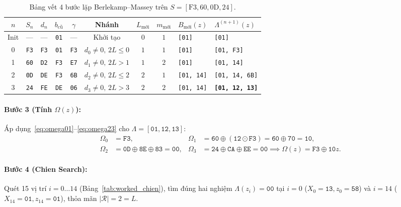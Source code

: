 \begin{table}[!htb]
\centering
\caption{Bảng vết 4 bước lặp Berlekamp--Massey trên $S = [\text{F3}, \text{60}, \text{0D}, \text{24}]$.}
\label{tab:worked_bm}
\scriptsize
\setlength{\tabcolsep}{4pt}
\begin{tabular}{@{} c c c c c c c c l l @{}}
\toprule
$n$ & $S_n$ & $d_n$ & $b_{\text{cũ}}$ & $\gamma$ & Nhánh & $L_{\text{mới}}$ & $m_{\text{mới}}$ & $B_{\text{mới}}(z)$ & $\Lambda^{(n+1)}(z)$ \\
\midrule
Init & --- & --- & \texttt{01} & --- & Khởi tạo & $0$ & $1$ & \texttt{[01]} & \texttt{[01]} \\
0 & \texttt{F3} & \texttt{F3} & \texttt{01} & \texttt{F3} & $d_0\neq 0,\, 2L\le 0$ & $1$ & $1$ & \texttt{[01]} & \texttt{[01, F3]} \\
1 & \texttt{60} & \texttt{D2} & \texttt{F3} & \texttt{E7} & $d_1\neq 0,\, 2L>1$ & $1$ & $2$ & \texttt{[01]} & \texttt{[01, 14]} \\
2 & \texttt{0D} & \texttt{DE} & \texttt{F3} & \texttt{6B} & $d_2\neq 0,\, 2L\le 2$ & $2$ & $1$ & \texttt{[01, 14]} & \texttt{[01, 14, 6B]} \\
3 & \texttt{24} & \texttt{FE} & \texttt{DE} & \texttt{06} & $d_3\neq 0,\, 2L>3$ & $2$ & $2$ & \texttt{[01, 14]} & \textbf{\texttt{[01, 12, 13]}} \\
\bottomrule
\end{tabular}
\end{table}

\paragraph{Bước 3 (Tính $\Omega(z)$):} Áp dụng~\eqref{eq:omega01}--\eqref{eq:omega23} cho $\Lambda = [\texttt{01}, \texttt{12}, \texttt{13}]$:
\begin{align*}
\Omega_0 &= \texttt{F3}, &
\Omega_1 &= \texttt{60} \oplus (\texttt{12} \odot \texttt{F3}) = \texttt{60} \oplus \texttt{70} = \texttt{10}, \\
\Omega_2 &= \texttt{0D} \oplus \texttt{8E} \oplus \texttt{83} = \texttt{00}, &
\Omega_3 &= \texttt{24} \oplus \texttt{CA} \oplus \texttt{EE} = \texttt{00} \implies \Omega(z) = \texttt{F3} \oplus \texttt{10}z.
\end{align*}

\paragraph{Bước 4 (Chien Search):} Quét 15 vị trí $i = 0 \dots 14$ (Bảng~\ref{tab:worked_chien}), tìm đúng hai nghiệm $\Lambda(z_i) = \texttt{00}$ tại $i = 0$ ($X_0 = \texttt{13}, z_0 = \texttt{58}$) và $i = 14$ ($X_{14} = \texttt{01}, z_{14} = \texttt{01}$), thỏa mãn $|\mathcal{R}| = 2 = L$.

